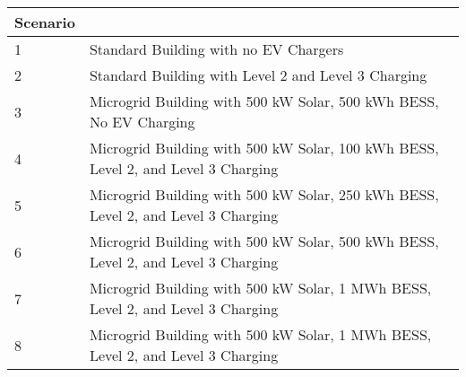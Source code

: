 \begin{tabularx}{\linewidth}{l | l}
\toprule
 Scenario &  \\
\midrule
		1  & Standard Building with no EV Chargers\\
        2 & Standard Building with Level 2 and Level 3 Charging\\
        3 & Microgrid Building with 500 kW Solar, 500 kWh BESS, No EV Charging \\
        4 & Microgrid Building with 500 kW Solar, 100 kWh BESS, Level 2, and Level 3 Charging\\
        5 & Microgrid Building with 500 kW Solar, 250 kWh BESS, Level 2, and Level 3 Charging\\
        6 & Microgrid Building with 500 kW Solar, 500 kWh BESS, Level 2, and Level 3 Charging\\
        7 & Microgrid Building with 500 kW Solar, 1 MWh BESS, Level 2, and Level 3 Charging\\
        8 & Microgrid Building with 500 kW Solar, 1 MWh BESS, Level 2, and Level 3 Charging\\
\bottomrule
\end{tabularx}
